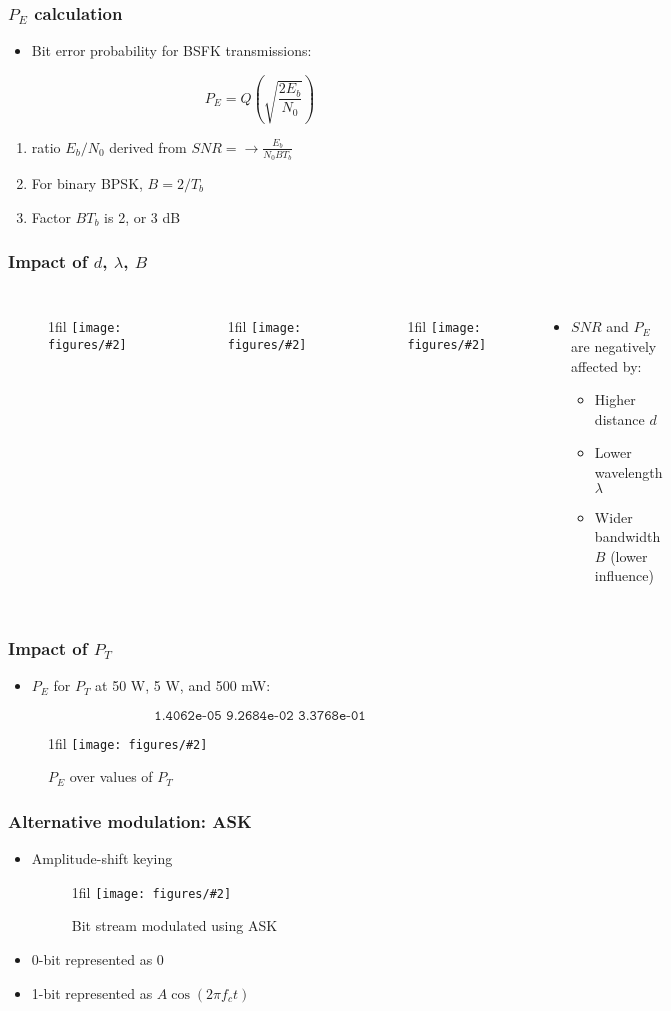 \documentclass{beamer}
\makeatletter
\newcommand{\code}[1]{\texttt{#1}}
\newcommand*{\centerfloat}{%
  \parindent \z@
  \leftskip \z@ \@plus 1fil \@minus \textwidth
  \rightskip\leftskip
  \parfillskip \z@skip}
\newcommand{\fig}[3]{
  \begin{figure}[H]
  \centerfloat
    \texttt{[image: figures/\#2]}
	\caption{#3}
  \end{figure}
}
\newcommand{\figNoCapt}[2]{
  \begin{figure}[H]
  \centerfloat
    \texttt{[image: figures/\#2]}
  \end{figure}
}
\makeatother
\begin{document}
\begin{frame}
	\frametitle{$P_E$ calculation}
	\begin{itemize}
		\item Bit error probability for BSFK transmissions:
	\end{itemize}
	\begin{equation}
		P_E = Q\left(\sqrt{\frac{2E_b}{N_0}}\right)
	\end{equation}
	\begin{enumerate}
		\item ratio $E_b / N_0$ derived from $SNR = \rightarrow \frac{E_b}{N_0 B T_b}$
		\item For binary BPSK, $B = 2/T_b$
		\item Factor $B T_b$ is 2, or 3 dB
	\end{enumerate}
\end{frame}

\begin{frame}
	\frametitle{Impact of $d$, $\lambda$, $B$}
	\begin{columns}
			\figNoCapt{2.75cm}{d_lambda.png}
			\figNoCapt{2.75cm}{lambda_b.png}
			\figNoCapt{2.75cm}{d_b.png}
			\begin{itemize}
				\item $SNR$ and $P_E$ are negatively affected by:
				\begin{itemize}
					\item Higher distance $d$
					\item Lower wavelength $\lambda$
					\item Wider bandwidth $B$ (lower influence)
				\end{itemize}
			\end{itemize}
	\end{columns}
\end{frame}

\begin{frame}
	\frametitle{Impact of $P_T$}
	\begin{itemize}
		\item $P_E$ for $P_T$ at 50 W, 5 W, and 500 mW:
	\end{itemize}
	\begin{equation}
		\code{1.4062e-05   9.2684e-02   3.3768e-01}
	\end{equation}
	\fig{4cm}{pe_over_pt.png}{$P_E$ over values of $P_T$}
\end{frame}

\begin{frame}
	\frametitle{Alternative modulation: ASK}
	\begin{itemize}
		\item Amplitude-shift keying
		\fig{2.5cm}{ask.png}{Bit stream modulated using ASK}
		\item 0-bit represented as 0
		\item 1-bit represented as $A\cos(2 \pi f_c t)$
	\end{itemize}
\end{frame}
\end{document}
